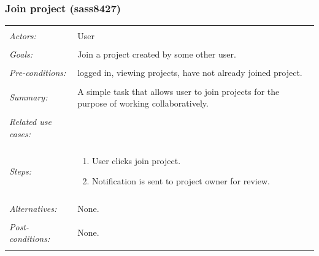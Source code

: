 \documentclass[11pt]{report}
\begin{document}
\subsubsection{Join project (sass8427)}
\begin{tabular}{ p{2cm} p{12cm} }
 \hline
 \\
 \textit{Actors:} & User \\ 
 \\
 \textit{Goals:} & Join a project created by some other user. \\
 \\
 \textit{Pre-conditions:} & logged in, viewing projects, have not already joined project.  \\
\\
 \textit{Summary:} & A simple task that allows user to join projects for the purpose of working collaboratively.\\ 
 \\
 \textit{Related use cases:} & \\ 
 \\
 \textit{Steps:} & \begin{enumerate}
  \item User clicks join project. 
  \item Notification is sent to project owner for review. 
 \end{enumerate} \\
 \\
 \textit{Alternatives:} & None. \\
 \\
 \textit{Post-conditions:} & None. \\
 \\
\hline
\end{tabular}
\end{document}
